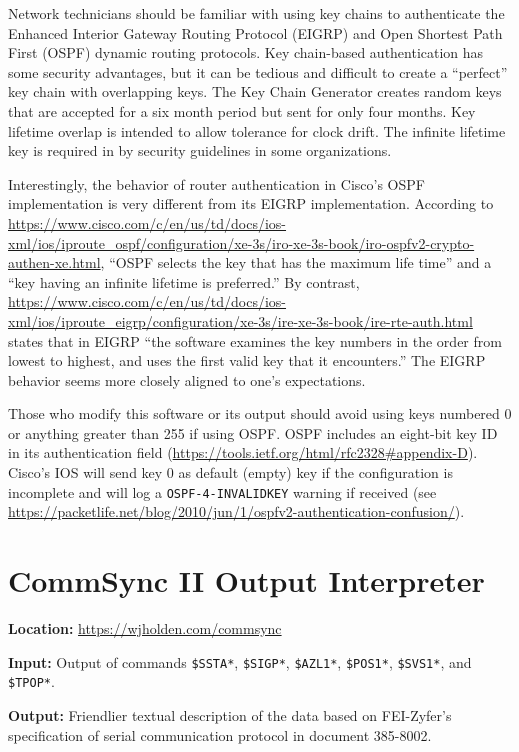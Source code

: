 \documentclass[12pt]{article}
\begin{document}
Network technicians should be familiar with using key chains to authenticate the Enhanced Interior Gateway Routing Protocol (EIGRP) and Open Shortest Path First (OSPF) dynamic routing protocols. Key chain-based authentication has some security advantages, but it can be tedious and difficult to create a ``perfect'' key chain with overlapping keys. The Key Chain Generator creates random keys that are accepted for a six month period but sent for only four months. Key lifetime overlap is intended to allow tolerance for clock drift. The infinite lifetime key is required in by security guidelines in some organizations.

Interestingly, the behavior of router authentication in Cisco's OSPF implementation is very different from its EIGRP implementation. According to \url{https://www.cisco.com/c/en/us/td/docs/ios-xml/ios/iproute_ospf/configuration/xe-3s/iro-xe-3s-book/iro-ospfv2-crypto-authen-xe.html}, ``OSPF selects the key that has the maximum life time'' and a ``key having an infinite lifetime is preferred.'' By contrast, \url{https://www.cisco.com/c/en/us/td/docs/ios-xml/ios/iproute_eigrp/configuration/xe-3s/ire-xe-3s-book/ire-rte-auth.html} states that in EIGRP ``the software examines the key numbers in the order from lowest to highest, and uses the first valid key that it encounters.'' The EIGRP behavior seems more closely aligned to one's expectations.

Those who modify this software or its output should avoid using keys numbered 0 or anything greater than 255 if using OSPF. OSPF includes an eight-bit key ID in its authentication field (\url{https://tools.ietf.org/html/rfc2328#appendix-D}). Cisco's IOS will send key 0 as default (empty) key if the configuration is incomplete and will log a \texttt{OSPF-4-INVALIDKEY} warning if received (see \url{https://packetlife.net/blog/2010/jun/1/ospfv2-authentication-confusion/}).

\section{CommSync II Output Interpreter}

\noindent \textbf{Location:} \url{https://wjholden.com/commsync}

\noindent \textbf{Input:} Output of commands  \texttt{\$SSTA*}, \texttt{\$SIGP*}, \texttt{\$AZL1*}, \texttt{\$POS1*}, \texttt{\$SVS1*}, and \texttt{\$TPOP*}.

\noindent \textbf{Output:}  Friendlier textual description of the data based on FEI-Zyfer's specification of serial communication protocol in document 385-8002.
\end{document}
